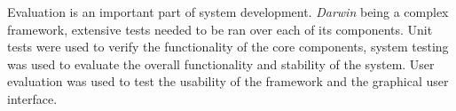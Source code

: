 Evaluation is an important part of system development. \textit{Darwin} being a complex framework, extensive
tests needed to be ran over each of its components. Unit tests were used to verify the functionality of the
core components, system testing was used to evaluate the overall functionality and stability of the system.
User evaluation was used to test the usability of the framework and the graphical user interface.